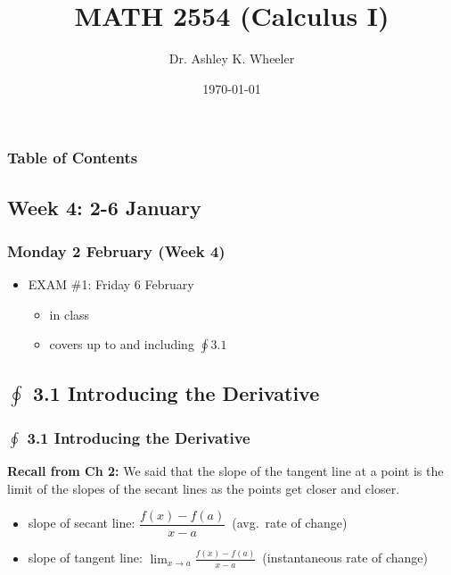 \documentclass[14pt]{beamer}
\title[Cal I S2015]{MATH 2554 (Calculus I)}
\subtitle{}
\author[Wheeler]{Dr. Ashley K. Wheeler}
\institute{University of Arkansas}
\date{\today}
\begin{document}
\maketitle

\begin{frame}
\frametitle{Table of Contents}
\tableofcontents
\end{frame}


\begin{frame}
\section[Week 4]{Week 4: 2-6 January}
\frametitle{Monday 2 February (Week 4)}
\begin{itemize}
\item EXAM \#1: Friday 6 February 
	\begin{itemize}
	\item in class
	\item covers up to and including $\oint 3.1$
	\end{itemize}
\end{itemize}
\end{frame}

\subsection[3.1 Introducing the Derivative]{$\oint$ 3.1 Introducing the Derivative}

\begin{frame}
\frametitle{$\oint$ 3.1 Introducing the Derivative}
\small
{\bf Recall from Ch 2:}  We said that the slope of the tangent line at a point is the limit of the slopes of the secant lines as the points get closer and closer.

\vspace{0.5pc}
\begin{itemize}
\item slope of secant line:  $\dfrac{f(x)-f(a)}{x-a}$\ (avg.\ rate of change) 

\vspace{0.5pc}
\item slope of tangent line:  $\displaystyle\lim_{x \to a} \frac{f(x)-f(a)}{x-a}$\ (instantaneous rate of change)
\end{itemize}
\end{frame}

\begin{frame}
\frametitle{}
\end{frame}
\end{document}
